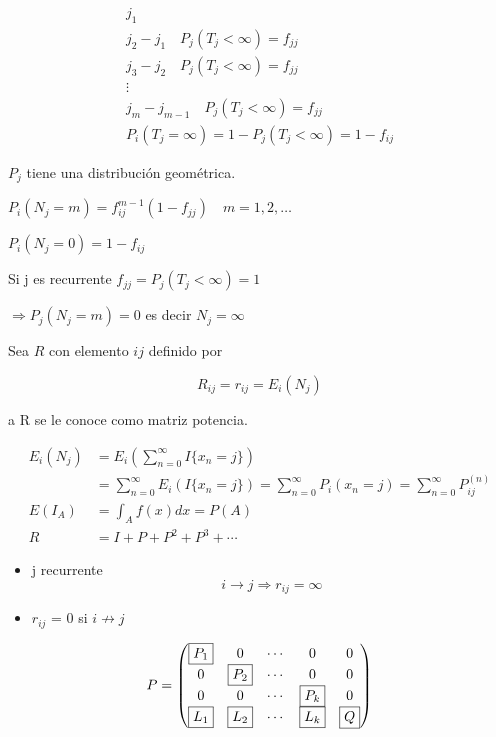 \begin{gather*}
    j_{1} \\
    j_{2} - j_{1}  \quad P_{j} (T_{j} < \infty ) = f_{jj} \\
    j_{3} - j_{2}  \quad P_{j} (T_{j} < \infty ) = f_{jj}\\
    \vdots \\
    j_{m} - j_{m-1}  \quad P_{j} (T_{j} < \infty ) = f_{jj} \\
    P_{i}(T_{j} = \infty) = 1- P_{j}(T_{j} < \infty) = 1 - f_{ij} 
\end{gather*}

$P_{j}$ tiene una distribución geométrica.

$P_{i} (N_{j} = m) = f_{ij}^{m-1} (1 - f_{jj}) \quad m= 1, 2, \dots$

$P_{i} (N_{j} = 0) = 1 - f_{ij}$

\begin{nota}
    Si j es recurrente $f_{jj} = P_{j} (T_{j} < \infty) = 1$

    $\Rightarrow P_{j} (N_{j} = m) = 0$ es decir $N_{j} = \infty$
\end{nota}


Sea $R$ con elemento $ij$ definido por 

\[
R_{ij} = r_{ij} = E_{i} (N_{j})
\]

a R se le conoce como matriz potencia.

\begin{align*}
    E_{i} (N_{j}) & = E_{i} (\sum_{n=0}^{\infty} I \{ x_{n} = j\}) \\
    & = \sum_{n=0}^{\infty} E_{i} (I \{ x_{n} = j\}) = \sum_{n=0}^{\infty} P_{i}(x_{n} = j) =\sum_{n=0}^{\infty} P_{ij}^{(n)} \\
    E(I_{A}) & = \int_{A} f(x)dx = P(A) \\
    R & = I + P + P^{2} + P^{3} + \cdots 
\end{align*}

\begin{itemize}
    \item j recurrente
    \[
    i \to j \Rightarrow r_{ij} = \infty
    \]
    \item $r_{ij}$ = 0 si  $i \not\to j$
\end{itemize}

\[
P =
\begin{pmatrix}
\fbox{$P_1$} & 0 & \cdots & 0 & 0 \\
0   & \fbox{$P_2$} & \cdots & 0 & 0 \\
0   & 0 & \cdots & \fbox{$P_k$} & 0 \\
\fbox{$L_1$} & \fbox{$L_2$} & \cdots & \fbox{$L_k$} & \fbox{$Q$}
\end{pmatrix}
\]

